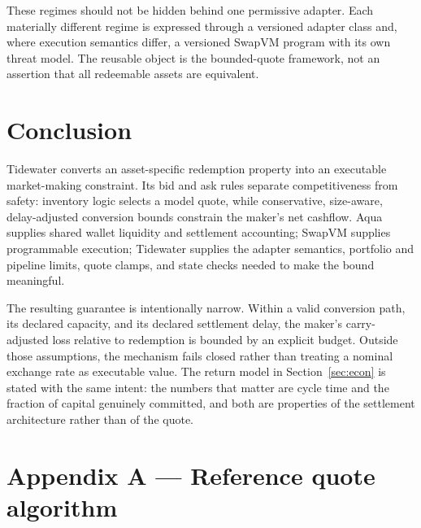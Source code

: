 \documentclass[10pt,twocolumn]{article}
\theoremstyle{definition}
\begin{document}
These regimes should not be hidden behind one permissive adapter. Each materially different regime is expressed
through a versioned adapter class and, where execution semantics differ, a versioned SwapVM program with its own
threat model. The reusable object is the bounded-quote framework, not an assertion that all redeemable assets are
equivalent.

\section{Conclusion}

Tidewater converts an asset-specific redemption property into an executable market-making constraint. Its bid and
ask rules separate competitiveness from safety: inventory logic selects a model quote, while conservative,
size-aware, delay-adjusted conversion bounds constrain the maker's net cashflow. Aqua supplies shared wallet
liquidity and settlement accounting; SwapVM supplies programmable execution; Tidewater supplies the adapter
semantics, portfolio and pipeline limits, quote clamps, and state checks needed to make the bound meaningful.

The resulting guarantee is intentionally narrow. Within a valid conversion path, its declared capacity, and its
declared settlement delay, the maker's carry-adjusted loss relative to redemption is bounded by an explicit
budget. Outside those assumptions, the mechanism fails closed rather than treating a nominal exchange rate as
executable value. The return model in Section~\ref{sec:econ} is stated with the same intent: the numbers that
matter are cycle time and the fraction of capital genuinely committed, and both are properties of the settlement
architecture rather than of the quote.

\appendix
\section*{Appendix A --- Reference quote algorithm}
\end{document}
